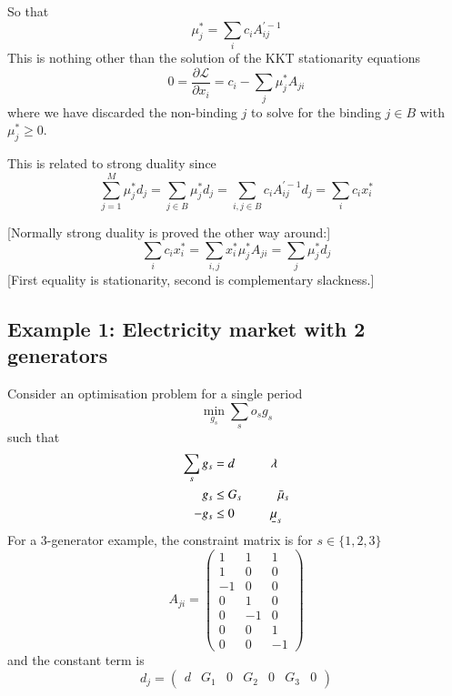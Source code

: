 \documentclass[final,3p,times]{elsarticle}
\newcommand{\ubar}[1]{\text{\b{$#1$}}}
\def\d{\partial}
\def\cL{\mathcal{L}}
\begin{document}
So that
\begin{equation}
\mu_j^* = \sum_i c_i  A^{\prime -1}_{ij}
\end{equation}
This is nothing other than the solution of the KKT stationarity equations
\begin{equation}
 0 =    \frac{\d \cL}{\d x_i} = c_i - \sum_j \mu_j^* A_{ji}
\end{equation}
where we have discarded the non-binding $j$ to solve for the binding $j\in B$ with $\mu_j^*\geq 0$.

This is related to strong duality since
\begin{equation}
  \sum_{j=1}^M \mu_j^* d_j = \sum_{j\in B} \mu_j^* d_j = \sum_{i,j\in B} c_i  A^{\prime -1}_{ij} d_j = \sum_i c_i x^*_i
\end{equation}

[Normally strong duality is proved the other way around:]
\begin{equation}
 \sum_i c_i x^*_i = \sum_{i,j} x^*_i  \mu_j^* A_{ji} = \sum_{j} \mu_j^* d_j
\end{equation}
[First equality is stationarity, second is complementary slackness.]


\subsection{Example 1: Electricity market with 2 generators}

Consider an optimisation problem for a single period
\begin{equation}
  \min_{g_s} \sum_s o_s g_s
\end{equation}
such that
\begin{align}
  \sum_s g_s & = d  \hspace{1cm} \lambda \\
  g_s & \leq G_s  \hspace{1cm} \bar{\mu}_s \\
  -g_s & \leq 0  \hspace{1cm} \ubar{\mu}_s
\end{align}
For a 3-generator example, the constraint matrix is for $s\in\{1,2,3\}$
\begin{equation}
  A_{ji}=\left(\begin{matrix}
    1 & 1 & 1\\
    1 & 0 & 0 \\
    -1 & 0 & 0 \\
     0 & 1 & 0 \\
     0 & -1 & 0 \\
     0 & 0 & 1 \\
     0 & 0 & -1
  \end{matrix}\right)
\end{equation}
and the constant term is
\begin{equation}
d_{j}=\left(\begin{matrix}
d  & G_1 & 0 & G_2 &  0 & G_3 & 0
\end{matrix}\right)
\end{equation}
\end{document}
